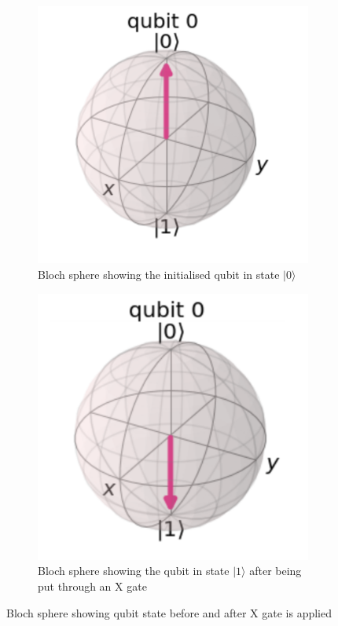 \begin{figure}[h]
    \centering
    \begin{subfigure}[h]{0.4\textwidth}
        \centering
        \includegraphics[width=\textwidth]{lab2/bSphX1.png}
        \caption{Bloch sphere showing the initialised qubit in state $|0\rangle$}
        \label{fig:bSphX1}
    \end{subfigure}
    \hfill
    \begin{subfigure}[h]{0.4\textwidth}
        \centering
        \includegraphics[width=\textwidth]{lab2/bSphX2.png}
        \caption{Bloch sphere showing the qubit in state $|1\rangle$ after being put through an X gate}
        \label{fig:bSphX2}
    \end{subfigure}
    \caption{Bloch sphere showing qubit state before and after X gate is applied} 
    \label{fig:bSphereXGate}
\end{figure}

